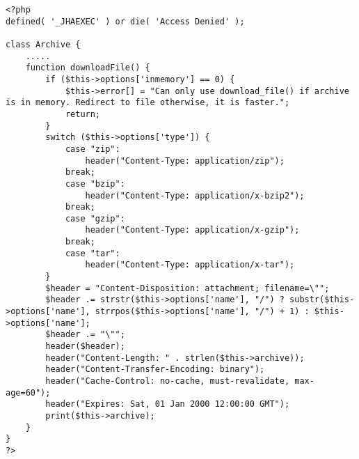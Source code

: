\begin{lstlisting}[label=compress_downloadable,caption=Opciones para la descarga de los compresos.]
<?php
defined( '_JHAEXEC' ) or die( 'Access Denied' );

class Archive {
    .....
    function downloadFile() {
		if ($this->options['inmemory'] == 0) {
			$this->error[] = "Can only use download_file() if archive is in memory. Redirect to file otherwise, it is faster.";
			return;
		}
		switch ($this->options['type']) {
			case "zip":
				header("Content-Type: application/zip");
			break;
			case "bzip":
				header("Content-Type: application/x-bzip2");
			break;
			case "gzip":
				header("Content-Type: application/x-gzip");
			break;
			case "tar":
				header("Content-Type: application/x-tar");
		}
		$header = "Content-Disposition: attachment; filename=\"";
		$header .= strstr($this->options['name'], "/") ? substr($this->options['name'], strrpos($this->options['name'], "/") + 1) : $this->options['name'];
		$header .= "\"";
		header($header);
		header("Content-Length: " . strlen($this->archive));
		header("Content-Transfer-Encoding: binary");
		header("Cache-Control: no-cache, must-revalidate, max-age=60");
		header("Expires: Sat, 01 Jan 2000 12:00:00 GMT");
		print($this->archive);
	}
}
?>
\end{lstlisting}
